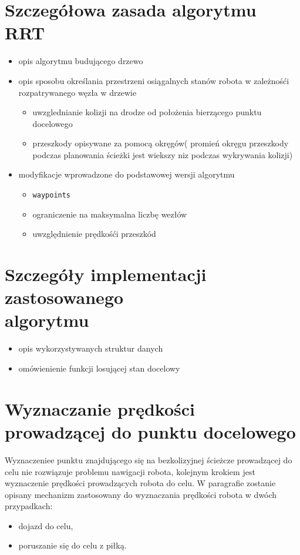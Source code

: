	\section{Szczegółowa zasada algorytmu RRT}
	\begin{itemize}
		\item opis algorytmu budującego drzewo
		\item opis sposobu określania przestrzeni osiągalnych stanów robota w zależnośći rozpatrywanego węzła w drzewie
		\begin{itemize}
			\item uwzglednianie kolizji na drodze od położenia bierzącego punktu docelowego	
			\item przeszkody opisywane za pomocą okręgów( promień okręgu przeszkody podczas planowania ścieżki jest
			wiekszy niz podczas wykrywania kolizji)
		\end{itemize}

		\item modyfikacje wprowadzone do podstawowej wersji algorytmu
		\begin{itemize}
		\item \texttt{waypoints}
		\item ograniczenie na maksymalna liczbę wezłów
		\item uwzględnienie prędkośći przeszkód
		\end{itemize}
	\end{itemize}


	\section{Szczegóły implementacji zastosowanego \\algorytmu }
	\begin{itemize}
	 \item opis wykorzystywanych struktur danych
	 \item omówienienie funkcji losującej stan docelowy
	\end{itemize}
	
	\section{Wyznaczanie prędkości prowadzącej do punktu docelowego}
	Wyznaczeniee punktu znajdującego się na bezkolizyjnej ścieżcze prowadzącej do celu nie rozwiązuje problemu nawigacji robota, kolejnym krokiem
	jest wyznaczenie prędkości prowadzących robota do celu.
	W paragrafie zostanie opisany mechanizm zastosowany do wyznaczania prędkości robota w dwóch przypadkach:
	\begin{itemize}
	 \item dojazd do celu,
	 \item poruszanie się do celu z piłką.
	\end{itemize}